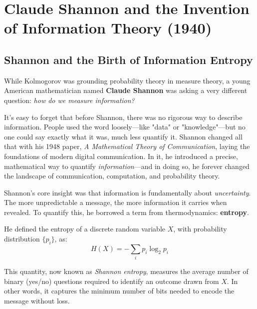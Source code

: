 \section{Claude Shannon and the Invention of Information Theory (1940)}


\subsection{Shannon and the Birth of Information Entropy}

While Kolmogorov was grounding probability theory in measure theory, a young American mathematician named \textbf{Claude Shannon} was asking a very different question: \emph{how do we measure information?}

It’s easy to forget that before Shannon, there was no rigorous way to describe information. People used the word loosely—like "data" or "knowledge"—but no one could say exactly what it was, much less quantify it. Shannon changed all that with his 1948 paper, \emph{A Mathematical Theory of Communication}, laying the foundations of modern digital communication. In it, he introduced a precise, mathematical way to quantify \emph{information}—and in doing so, he forever changed the landscape of communication, computation, and probability theory.

Shannon’s core insight was that information is fundamentally about \emph{uncertainty}. The more unpredictable a message, the more information it carries when revealed. To quantify this, he borrowed a term from thermodynamics: \textbf{entropy}.

He defined the entropy of a discrete random variable \( X \), with probability distribution \( \{p_i\} \), as:
\[
H(X) = - \sum_i p_i \log_2 p_i
\]

This quantity, now known as \emph{Shannon entropy}, measures the average number of binary (yes/no) questions required to identify an outcome drawn from \( X \). In other words, it captures the minimum number of bits needed to encode the message without loss.

